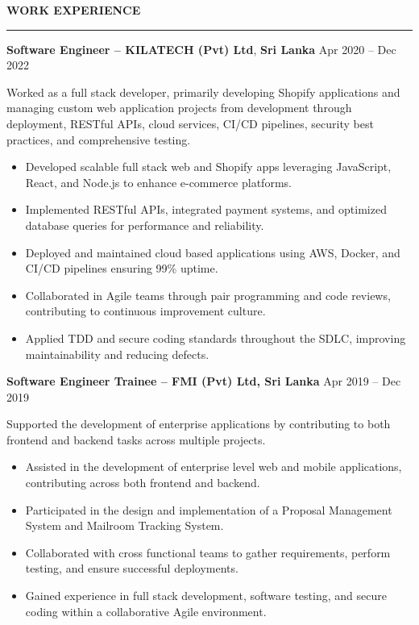\documentclass[10pt,letterpaper]{article}
\begin{document}
\vspace{6pt}

\textbf{WORK EXPERIENCE}\\[-8pt]
\noindent\rule{\textwidth}{0.1pt}

\vspace{1pt}

\textbf{Software Engineer -- KILATECH (Pvt) Ltd}, \textbf{Sri Lanka} \hfill Apr 2020 -- Dec 2022

\vspace{1pt}

Worked as a full stack developer, primarily developing Shopify applications and managing custom web application projects from development through deployment, RESTful APIs, cloud services, CI/CD pipelines, security best practices, and comprehensive testing.

\begin{itemize}
\item Developed scalable full stack web and Shopify apps leveraging JavaScript, React, and Node.js to enhance e-commerce platforms.
\item Implemented RESTful APIs, integrated payment systems, and optimized database queries for performance and reliability.
\item Deployed and maintained cloud based applications using AWS, Docker, and CI/CD pipelines ensuring 99\% uptime.
\item Collaborated in Agile teams through pair programming and code reviews, contributing to continuous improvement culture.
\item Applied TDD and secure coding standards throughout the SDLC, improving maintainability and reducing defects.
\end{itemize}

\textbf{Software Engineer Trainee -- FMI (Pvt) Ltd, Sri Lanka} \hfill Apr 2019 -- Dec 2019

\vspace{1pt}

Supported the development of enterprise applications by contributing to both frontend and backend tasks across multiple projects.

\begin{itemize}
\item Assisted in the development of enterprise level web and mobile applications, contributing across both frontend and backend.
\item Participated in the design and implementation of a Proposal Management System and Mailroom Tracking System.
\item Collaborated with cross functional teams to gather requirements, perform testing, and ensure successful deployments.
\item Gained experience in full stack development, software testing, and secure coding within a collaborative Agile environment.
\end{itemize}
\end{document}
